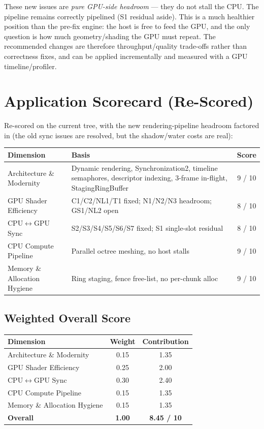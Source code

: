 \documentclass[a4paper,12pt]{article}
\begin{document}
These new issues are \emph{pure GPU-side headroom} — they do not stall the CPU.
The pipeline remains correctly pipelined (S1 residual aside). This is a much
healthier position than the pre-fix engine: the host is free to feed the GPU, and
the only question is how much geometry/shading the GPU must repeat. The
recommended changes are therefore throughput/quality trade-offs rather than
correctness fixes, and can be applied incrementally and measured with a GPU
timeline/profiler.

\newpage

\section{Application Scorecard (Re-Scored)}

Re-scored on the current tree, with the new rendering-pipeline headroom factored
in (the old sync issues are resolved, but the shadow/water costs are real):

\begin{center}
\begin{tabular}{lp{6.5cm}c}
\toprule
\textbf{Dimension} & \textbf{Basis} & \textbf{Score} \\
\midrule
Architecture \& Modernity & Dynamic rendering, Synchronization2, timeline
  semaphores, descriptor indexing, 3-frame in-flight, StagingRingBuffer & 9 / 10 \\
\midrule
GPU Shader Efficiency & C1/C2/NL1/T1 fixed; N1/N2/N3 headroom; GS1/NL2 open & 8 / 10 \\
\midrule
CPU$\leftrightarrow$GPU Sync & S2/S3/S4/S5/S6/S7 fixed; S1 single-slot residual & 8 / 10 \\
\midrule
CPU Compute Pipeline & Parallel octree meshing, no host stalls & 9 / 10 \\
\midrule
Memory \& Allocation Hygiene & Ring staging, fence free-list, no per-chunk alloc & 9 / 10 \\
\bottomrule
\end{tabular}
\end{center}

\subsection*{Weighted Overall Score}

\begin{center}
\begin{tabular}{lcc}
\toprule
\textbf{Dimension} & \textbf{Weight} & \textbf{Contribution} \\
\midrule
Architecture \& Modernity & 0.15 & 1.35 \\
GPU Shader Efficiency      & 0.25 & 2.00 \\
CPU$\leftrightarrow$GPU Sync & 0.30 & 2.40 \\
CPU Compute Pipeline      & 0.15 & 1.35 \\
Memory \& Allocation Hygiene & 0.15 & 1.35 \\
\midrule
\textbf{Overall} & \textbf{1.00} & \textbf{8.45 / 10} \\
\bottomrule
\end{tabular}
\end{center}
\end{document}
